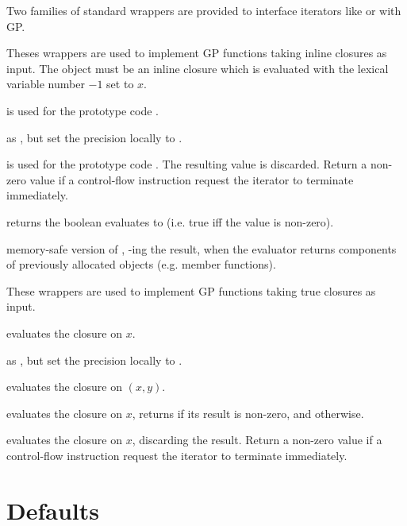 Two families of standard wrappers are provided to interface iterators like
 or  with GP.

Theses wrappers are used to implement GP functions taking inline closures as
input. The object  must be an inline closure which is evaluated
with the lexical variable number $-1$ set to $x$.

 is used for the prototype code .

 as , but
set the precision locally to .

 is used for the prototype code
. The resulting value is discarded.  Return a non-zero value if a
control-flow instruction request the iterator to terminate immediately.

 returns the boolean
 evaluates to (i.e. true iff the value is non-zero).

 memory-safe version of ,
-ing the result, when the evaluator returns components of
previously allocated objects (e.g. member functions).

These wrappers are used to implement GP functions taking true closures as
input.

 evaluates the closure  on $x$.

 as ,
but set the precision locally to .

 evaluates the closure 
on $(x,y)$.

 evaluates the closure  on
$x$, returns  if its result is non-zero, and  otherwise.

 evaluates the closure  on
$x$, discarding the result. Return a non-zero value if a control-flow
instruction request the iterator to terminate immediately.

\section{Defaults}

